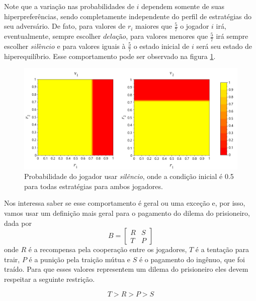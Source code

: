 Note que a variação nas probabilidades de $i$ dependem somente de suas hiperpreferências, sendo completamente independente do perfil de estratégias do seu adversário. De fato, para valores de $r_i$ maiores que $\frac{5}{7}$ o jogador $i$ irá, eventualmente, sempre escolher $\textit{delação}$, para valores menores que $\frac{5}{7}$ irá sempre escolher $\textit{silêncio}$ e para valores iguais à $\frac{5}{7}$ o estado inicial de $i$ será seu estado de hiperequilíbrio. Esse comportamento pode ser observado na figura \ref{fig:pd-neg-payoff}.

\begin{figure}[h]
    \caption{Probabilidade do jogador usar \textit{silêncio}, onde a condição inicial é 0.5 para todas estratégias para ambos jogadores.}
    \centerline{\includegraphics[scale=0.43]{./img/PD-neg-payoff.png}}
    \label{fig:pd-neg-payoff}
\end{figure}

Nos interessa saber se esse comportamento é geral ou uma exceção e, por isso, vamos usar um definição mais geral para o pagamento do dilema do prisioneiro, dada por
\begin{equation}
    \label{payoffGeralPD}
    B=
    \begin{bmatrix}
        R & S\\ 
        T & P 
    \end{bmatrix}
\end{equation}
onde $R$ é a recompensa pela cooperação entre os jogadores, $T$ é a tentação para trair, $P$ é a punição pela traição mútua e $S$ é o pagamento do ingênuo, que foi traído. Para que esses valores representem um dilema do prisioneiro eles devem respeitar a seguinte restrição.

\begin{equation}
    \label{desigualdadePD}
    T>R>P>S
\end{equation}

